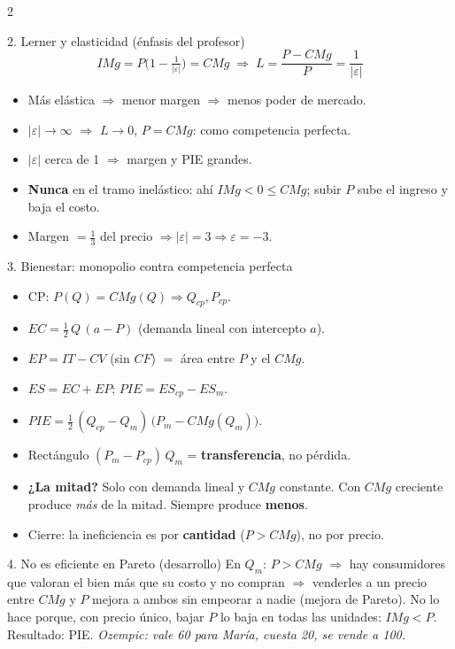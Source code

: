 \documentclass[10pt]{article}
\begin{document}
\begin{multicols}{2}
\begin{caja}{2. Lerner y elasticidad (énfasis del profesor)}
\[
IMg = P\Big(1 - \tfrac{1}{|\varepsilon|}\Big) = CMg \;\Rightarrow\; L = \frac{P - CMg}{P} = \frac{1}{|\varepsilon|}
\]
\begin{itemize}
\item Más elástica $\Rightarrow$ menor margen $\Rightarrow$ menos poder de mercado.
\item $|\varepsilon| \to \infty$ $\Rightarrow$ $L \to 0$, $P = CMg$: como competencia perfecta.
\item $|\varepsilon|$ cerca de 1 $\Rightarrow$ margen y PIE grandes.
\item \textbf{Nunca} en el tramo inelástico: ahí $IMg < 0 \leq CMg$; subir $P$ sube el ingreso y baja el costo.
\item Margen $= \tfrac13$ del precio $\Rightarrow |\varepsilon| = 3 \Rightarrow \varepsilon = -3$.
\end{itemize}
\end{caja}

\begin{caja}{3. Bienestar: monopolio contra competencia perfecta}
\begin{itemize}
\item CP: $P(Q) = CMg(Q) \Rightarrow Q_{cp}, P_{cp}$.
\item $EC = \tfrac12\,Q\,(a - P)$ \;(demanda lineal con intercepto $a$).
\item $EP = IT - CV$ \;(sin $CF$) $= $ área entre $P$ y el $CMg$.
\item $ES = EC + EP$; \quad $PIE = ES_{cp} - ES_m$.
\item $PIE = \tfrac12\,(Q_{cp} - Q_m)\,\big(P_m - CMg(Q_m)\big)$.
\item Rectángulo $(P_m - P_{cp})\,Q_m$ = \textbf{transferencia}, no pérdida.
\item \textbf{¿La mitad?} Solo con demanda lineal y $CMg$ constante. Con $CMg$ creciente produce \emph{más} de la mitad. Siempre produce \textbf{menos}.
\item Cierre: la ineficiencia es por \textbf{cantidad} ($P > CMg$), no por precio.
\end{itemize}
\end{caja}

\begin{caja}{4. No es eficiente en Pareto (desarrollo)}
En $Q_m$: $P > CMg$ $\Rightarrow$ hay consumidores que valoran el bien más que su costo y no compran $\Rightarrow$ venderles a un precio entre $CMg$ y $P$ mejora a ambos sin empeorar a nadie (mejora de Pareto). No lo hace porque, con precio único, bajar $P$ lo baja en todas las unidades: $IMg < P$. Resultado: PIE. \emph{Ozempic: vale 60 para María, cuesta 20, se vende a 100.}
\end{caja}


\end{multicols}
\end{document}
